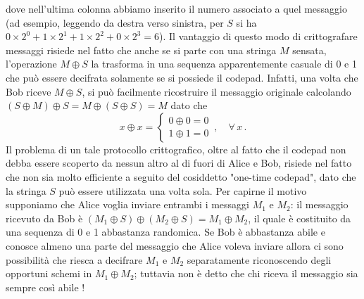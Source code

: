 \noindent dove nell'ultima colonna abbiamo inserito il numero associato a quel messaggio (ad esempio, leggendo da destra verso sinistra, per $S$ si ha $0 \times 2^0 + 1 \times 2^1 + 1 \times 2^2 + 0 \times 2^3 = 6$). Il vantaggio di questo modo di crittografare messaggi risiede nel fatto che anche se si parte con una stringa $M$ sensata, l'operazione $M \oplus S$ la trasforma in una sequenza apparentemente casuale di 0 e 1 che può essere decifrata solamente se si possiede il codepad. Infatti, una volta che Bob riceve $M \oplus S$, si può facilmente ricostruire il messaggio originale calcolando $(S \oplus M) \oplus S = M \oplus (S \oplus S) = M$ dato che 
\begin{equation*}
    x \oplus x =
    \begin{cases}
        0 \oplus 0 = 0 \\
        1 \oplus 1 = 0 
    \end{cases} \, , \quad \forall \, x \, .
\end{equation*}
Il problema di un tale protocollo crittografico, oltre al fatto che il codepad non debba essere scoperto da nessun altro al di fuori di Alice e Bob, risiede nel fatto che non sia molto efficiente a seguito del cosiddetto "one-time codepad", dato che la stringa $S$ può essere utilizzata una volta sola. Per capirne il motivo supponiamo che Alice voglia inviare entrambi i messaggi $M_1$ e $M_2$: il messaggio ricevuto da Bob è $(M_1 \oplus S) \oplus (M_2 \oplus S) = M_1 \oplus M_2$, il quale è costituito da una sequenza di 0 e 1 abbastanza randomica. Se Bob è abbastanza abile e conosce almeno una parte del messaggio che Alice voleva inviare allora ci sono possibilità che riesca a decifrare $M_1$ e $M_2$ separatamente riconoscendo degli opportuni schemi in $M_1 \oplus M_2$; tuttavia non è detto che chi riceva il messaggio sia sempre così abile !


